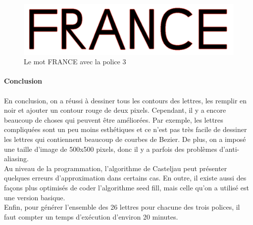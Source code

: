 \documentclass[a4paper, 12pt]{article}
\begin{document}
\begin{figure}[h]
\centering
\includegraphics[scale=0.6]{Images/FRANCE_FontV3.jpeg}
\caption{Le mot FRANCE avec la police 3}
\label{fig7}
\end{figure}
 
\newpage
{} %
	\vspace*{3cm}
	\paragraph{\Huge{Conclusion}}

	\paragraph{}
	En conclusion, on a réussi à dessiner tous les contours des lettres, les remplir en noir et ajouter un contour rouge de deux pixels. Cependant, il y a encore beaucoup de choses qui peuvent être améliorées. Par exemple, les lettres compliquées sont un peu moins esthétiques et ce n’est pas très facile de dessiner les lettres qui contiennent beaucoup de courbes de Bezier. De plus, on a imposé une taille d'image de 500x500 pixels, donc il y a parfois des problèmes d'anti-aliasing.\\
	
	Au niveau de la programmation, l'algorithme de Casteljau peut présenter quelques erreurs d'approximation dans certains cas. En outre, il existe aussi des façons plus optimisés de coder l'algorithme seed fill, mais celle qu'on a utilisé est une version basique.\\
	
	Enfin, pour générer l'ensemble des 26 lettres pour chacune des trois polices, il faut compter un temps d'exécution d'environ 20 minutes.
\end{document}

